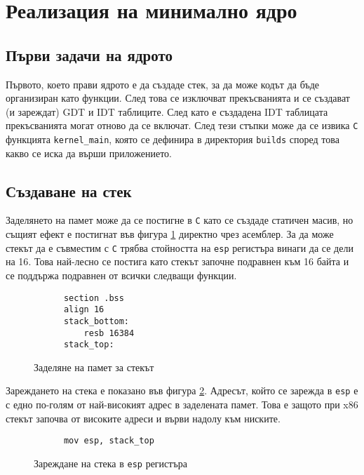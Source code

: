 \section{Реализация на минимално ядро}
  \subsection{Първи задачи на ядрото}
  Първото, което прави ядрото е да създаде стек, за да може кодът да бъде организиран като функции. След това се изключват прекъсванията и се създават (и зареждат) GDT и IDT таблиците. След като е създадена IDT таблицата прекъсванията могат отново да се включат. След тези стъпки може да се извика {\tt C} функцията {\tt kernel\_main}, която се дефинира в директория {\tt builds} според това какво се иска да върши приложението.

  \subsection{Създаване на стек}
  Заделянето на памет може да се постигне в {\tt C} като се създаде статичен масив, но същият ефект е постигнат във фигура \ref{fig:stack-alloc} директно чрез асемблер. За да може стекът да е съвместим с {\tt C} трябва стойността на {\tt esp} регистъра винаги да се дели на 16\cite{sysvabi}. Това най-лесно се постига като стекът започне подравнен към 16 байта и се поддържа подравнен от всички следващи функции.

  \begin{figure}[htpb]
    \centering
    \caption{Заделяне на памет за стекът}
    \begin{verbatim}
      section .bss
      align 16
      stack_bottom:
          resb 16384
      stack_top:
    \end{verbatim}
    \label{fig:stack-alloc}
  \end{figure}

  Зареждането на стека е показано във фигура \ref{fig:stack-esp}. Адресът, който се зарежда в {\tt esp} е с едно по-голям от най-високият адрес в заделената памет. Това е защото при x86 стекът започва от високите адреси и върви надолу към ниските.\cite{assembly-for-beginners}

  \begin{figure}[htpb]
    \centering
    \caption{Зареждане на стека в {\tt esp} регистъра}
    \begin{verbatim}
      mov esp, stack_top
    \end{verbatim}
    \label{fig:stack-esp}
  \end{figure}

